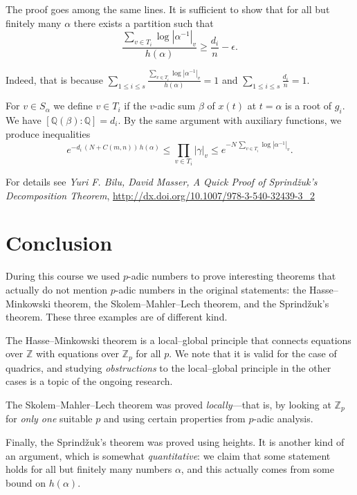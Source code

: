 \documentclass{article}
\newcommand{\ZZ}{\mathbb{Z}}
\newcommand{\QQ}{\mathbb{Q}}
\theoremstyle{myplain}
\theoremstyle{mydefinition}
\begin{document}
The proof goes among the same lines. It is sufficient to show that for all but
finitely many $\alpha$ there exists a partition such that
\[ \frac{\sum_{v\in T_i} \log |\alpha^{-1}|_v}{h (\alpha)} \ge \frac{d_i}{n} - \epsilon. \]

Indeed, that is because
$\sum_{1 \le i \le s} \frac{\sum_{v\in T_i} \log |\alpha^{-1}|_v}{h (\alpha)} = 1$
and $\sum_{1 \le i \le s} \frac{d_i}{n} = 1$.

For $v \in S_\alpha$ we define $v \in T_i$ if the $v$-adic sum $\beta$ of
$x (t)$ at $t = \alpha$ is a root of $g_i$. We have
$[\QQ (\beta) : \QQ] = d_i$. By the same argument with auxiliary functions, we
produce inequalities
\[ e^{-d_i \, (N + C(m,n))\,h (\alpha)} \le \prod_{v\in T_i} |\gamma|_v \le
  e^{-N \, \sum_{v \in T_i} \log |\alpha^{-1}|_v}. \]

For details see \emph{Yuri F. Bilu, David Masser, A Quick Proof of
  Sprind\v{z}uk's Decomposition Theorem},
\url{http://dx.doi.org/10.1007/978-3-540-32439-3_2}

\pagebreak

\section*{Conclusion}

During this course we used $p$-adic numbers to prove interesting theorems that
actually do not mention $p$-adic numbers in the original statements: the
Hasse--Minkowski theorem, the Skolem--Mahler--Lech theorem, and the
Sprind\v{z}uk's theorem. These three examples are of different kind.

The Hasse--Minkowski theorem is a local--global principle that connects
equations over $\ZZ$ with equations over $\ZZ_p$ for all $p$. We note that it is
valid for the case of quadrics, and studying \emph{obstructions} to the
local--global principle in the other cases is a topic of the ongoing research.

The Skolem--Mahler--Lech theorem was proved \emph{locally}---that is, by looking
at $\ZZ_p$ for \emph{only one} suitable $p$ and using certain properties from
$p$-adic analysis.

Finally, the Sprind\v{z}uk's theorem was proved using heights. It is another
kind of an argument, which is somewhat \emph{quantitative}: we claim that some
statement holds for all but finitely many numbers $\alpha$, and this actually
comes from some bound on $h (\alpha)$.
\end{document}
